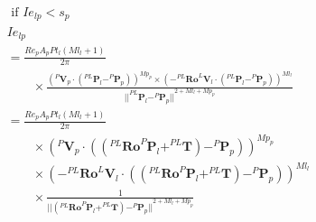 \begin{description}
        \begin{equation}
            \label{eqn:model_coor_extend}
            \begin{aligned}
                &\text { if } Ie_{lp}<s_p \\
                &Ie_{lp} \\&= \frac{Re_pA_pPt_l(Ml_{l}+1)}{2 \pi} 
                \\
                &\qquad \times
                 \frac{ 
                    {(
                        ^{P}\boldsymbol{V}_p 
                        \cdot 
                        (
                            ^{PL}\boldsymbol{P}_l- ^{P}\boldsymbol{P}_p
                        )
                    )}
                    ^{Mp_{p}}
                    \times 
                    {(
                        -^{PL}\boldsymbol{Ro}^{L}\boldsymbol{V}_l 
                        \cdot 
                        ({
                            ^{PL}\boldsymbol{P}_l
                            - ^{P}\boldsymbol{P}_p
                        })
                    )}^{Ml_{l}}
                } 
                  {{||^{PL}\boldsymbol{P}_l- ^{P}\boldsymbol{P}_p||}^{2+Ml_l+Mp_p}}\\
                  &= \frac{Re_pA_pPt_l(Ml_{l}+1)}{2 \pi}\\
                  &\qquad\times 
                  {( ^{P}\boldsymbol{V}_p \cdot 
                            (
                                (
                                    ^{PL} \boldsymbol{Ro}^{P}\boldsymbol{P}_l
                                    + ^{PL}\boldsymbol{T}
                                )
                                - ^{P}\boldsymbol{P}_p
                            )
                        )}^{Mp_{p}}\\
                &\qquad\times
                {
                            (
                                -^{PL}\boldsymbol{Ro}^{L}\boldsymbol{V}_l 
                                \cdot 
                                (
                                    (
                                        ^{PL}\boldsymbol{Ro}^{P}\boldsymbol{P}_l
                                        +^{PL}\boldsymbol{T}
                                    )
                                    - ^{P}\boldsymbol{P}_p
                                )
                            )
                        }^{Ml_{l}}   \\
                & \qquad \times
                   \frac{     
                        1   
                    } 
                    {
                        {
                            ||
                                (^{PL}\boldsymbol{Ro}^{P}\boldsymbol{P}_l+^{PL}\boldsymbol{T})
                                - ^{P}\boldsymbol{P}_p
                            ||
                        }^{2+Ml_l+Mp_p}
                    }\\
            \end{aligned}
        \end{equation}

        \end{description}   


